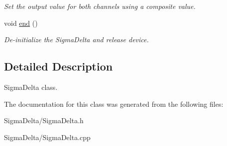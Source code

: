 \begin{DoxyCompactItemize}
\begin{DoxyCompactList}\small\item\em Set the output value for both channels using a composite value. \end{DoxyCompactList}\item 
\hypertarget{classSigmaDelta__class_a54aaeea358d236d7ab1a04de261006b0}{void \hyperlink{classSigmaDelta__class_a54aaeea358d236d7ab1a04de261006b0}{end} ()}\label{classSigmaDelta__class_a54aaeea358d236d7ab1a04de261006b0}

\begin{DoxyCompactList}\small\item\em De-\/initialize the Sigma\-Delta and release device. \end{DoxyCompactList}\end{DoxyCompactItemize}


\subsection{Detailed Description}
Sigma\-Delta class. 

The documentation for this class was generated from the following files\-:\begin{DoxyCompactItemize}
\item 
Sigma\-Delta/Sigma\-Delta.\-h\item 
Sigma\-Delta/Sigma\-Delta.\-cpp\end{DoxyCompactItemize}
